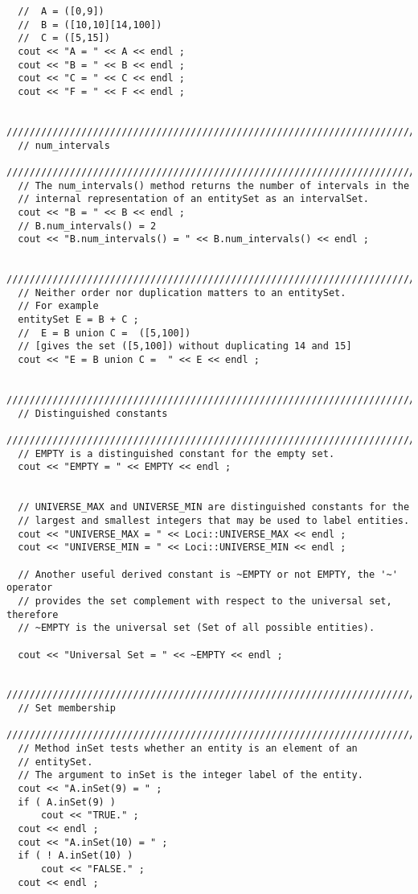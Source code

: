 \begin{verbatim}
  //  A = ([0,9])
  //  B = ([10,10][14,100])
  //  C = ([5,15])
  cout << "A = " << A << endl ;
  cout << "B = " << B << endl ;
  cout << "C = " << C << endl ;
  cout << "F = " << F << endl ;

  /////////////////////////////////////////////////////////////////////////////
  // num_intervals
  /////////////////////////////////////////////////////////////////////////////
  // The num_intervals() method returns the number of intervals in the
  // internal representation of an entitySet as an intervalSet.
  cout << "B = " << B << endl ;
  // B.num_intervals() = 2
  cout << "B.num_intervals() = " << B.num_intervals() << endl ; 

  ////////////////////////////////////////////////////////////////////////////
  // Neither order nor duplication matters to an entitySet.
  // For example
  entitySet E = B + C ;
  //  E = B union C =  ([5,100])
  // [gives the set ([5,100]) without duplicating 14 and 15]
  cout << "E = B union C =  " << E << endl ;

  ////////////////////////////////////////////////////////////////////////////
  // Distinguished constants
  ////////////////////////////////////////////////////////////////////////////
  // EMPTY is a distinguished constant for the empty set.
  cout << "EMPTY = " << EMPTY << endl ;

  
  // UNIVERSE_MAX and UNIVERSE_MIN are distinguished constants for the
  // largest and smallest integers that may be used to label entities.
  cout << "UNIVERSE_MAX = " << Loci::UNIVERSE_MAX << endl ;
  cout << "UNIVERSE_MIN = " << Loci::UNIVERSE_MIN << endl ;

  // Another useful derived constant is ~EMPTY or not EMPTY, the '~' operator
  // provides the set complement with respect to the universal set, therefore
  // ~EMPTY is the universal set (Set of all possible entities).

  cout << "Universal Set = " << ~EMPTY << endl ;
  
  ////////////////////////////////////////////////////////////////////////////
  // Set membership
  ////////////////////////////////////////////////////////////////////////////
  // Method inSet tests whether an entity is an element of an
  // entitySet.
  // The argument to inSet is the integer label of the entity.
  cout << "A.inSet(9) = " ; 
  if ( A.inSet(9) )
      cout << "TRUE." ;
  cout << endl ;
  cout << "A.inSet(10) = " ; 
  if ( ! A.inSet(10) )
      cout << "FALSE." ;  
  cout << endl ;


\end{verbatim}
